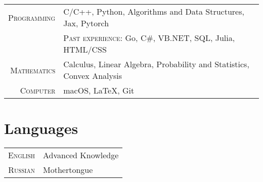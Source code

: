 \begin{tabular}{rl}
	\textsc{Programming} & C/C++, Python, Algorithms and Data Structures, Jax, Pytorch\\
	& \textsc{Past experience:} Go, C\#, VB.NET, SQL, Julia, HTML/CSS\\
	\textsc{Mathematics} & Calculus, Linear Algebra, Probability and Statistics, Convex Analysis\\
	\textsc{Computer} & macOS, LaTeX, Git\\
\end{tabular}

\section{Languages}

\begin{tabular}{rl}
	\textsc{English} & Advanced Knowledge \\
	\textsc{Russian} & Mothertongue\\
\end{tabular}